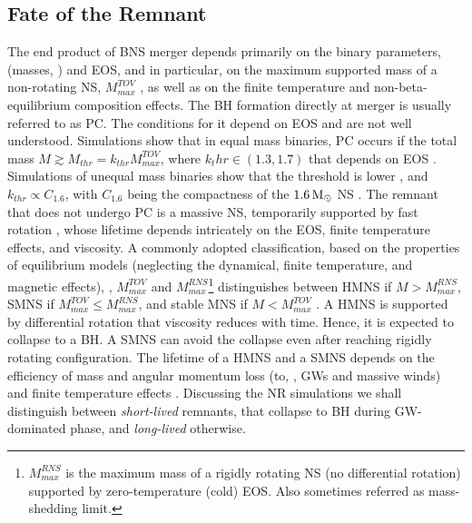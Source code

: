 \subsection{Fate of the Remnant}

The end product of \ac{BNS} merger depends primarily on the binary parameters, (masses, 
\mr{}) and \ac{EOS}, and in particular, on the maximum supported mass of a non-rotating 
\ac{NS}, $M_{max}^{TOV}$ \citep{Shibata:2016}, as well as on the finite temperature and 
non-beta-equilibrium composition effects. 
%
The \ac{BH} formation directly at merger is usually referred to as \ac{PC}. 
The conditions for it depend on \ac{EOS} and are not well understood. 
Simulations show that in equal mass binaries, \ac{PC} occurs if the total mass 
$M\gtrsim M_{thr} = k_{thr}M_{max}^{TOV}$, where $k_thr\in(1.3,1.7)$ that depends on 
\ac{EOS} \citep{Shibata:2005ss,Shibata:2006nm,Hotokezaka:2011dh,Bauswein:2013jpa}.
Simulations of unequal mass binaries show that the threshold is lower \citep{Bauswein:2017vtn}, 
and $k_{thr}{\propto}C_{1.6}$, with $C_{1.6}$ being the compactness of the $1.6\,{\text{M}_{\odot}}$ 
\ac{NS} \citep{Hotokezaka:2011dh,Bauswein:2013jpa,Bauswein:2017vtn}. 
%
The remnant that does not undergo \ac{PC} is a massive \ac{NS}, temporarily supported 
by fast rotation \citep{Baumgarte:1999cq,Rosswog:2001fh,Shibata:2005ss,Shibata:2006nm,
    Sekiguchi:2011zd,Hotokezaka:2013iia,Bernuzzi:2015opx}, whose lifetime depends 
intricately on the \ac{EOS}, finite temperature effects, and viscosity. A commonly 
adopted classification, based on the properties of equilibrium models (neglecting the 
dynamical, finite temperature, and magnetic effects), \ie, $M_{max}^{TOV}$ and
$M_{max}^{RNS}$\footnote{
    $M_{max}^{RNS}$ is the maximum mass of a rigidly rotating \ac{NS} (no differential 
    rotation) supported by zero-temperature (cold) \ac{EOS}. Also sometimes referred as 
    mass-shedding limit.
}
distinguishes between 
\ac{HMNS} if $M{>}M_{max}^{RNS}$, 
\ac{SMNS} if $M_{max}^{TOV} {\leq} M_{max}^{RNS}$,
and stable \ac{MNS} if $M {<} M_{max}^{TOV}$ \citep[\eg][]{Baumgarte:1999cq}.
A \ac{HMNS} is supported by differential rotation that viscosity reduces with time. 
Hence, it is expected to collapse to a \ac{BH}. A \ac{SMNS} can avoid the collapse 
even after reaching rigidly rotating configuration. The lifetime of a \ac{HMNS} and 
a \ac{SMNS} depends on the efficiency of mass and angular momentum loss 
(to, \eg, \acp{GW} and massive winds) and finite temperature effects \citep{Radice:2018xqa}. 
%
Discussing the \ac{NR} simulations we shall distinguish between \textit{short-lived} remnants, 
that collapse to \ac{BH} during \ac{GW}-dominated phase, 
and \textit{long-lived} otherwise.

